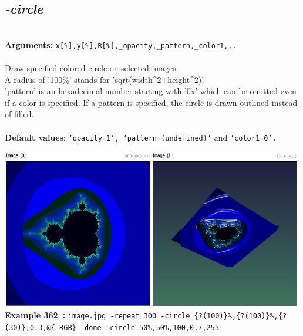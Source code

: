 \documentclass[a4paper,11pt,twoside]{book}
\begin{document}
\subsection{\emph{-circle} }\vspace*{-0.5em}
~\\\textbf{Arguments: } 
{\small \texttt{x[\%],y[\%],R[\%],\_opacity,\_pattern,\_color1,..}}\\~\\
Draw specified colored circle on selected images.
~\\A radius of '100\%' stands for 'sqrt(width\textasciicircum 2+height\textasciicircum 2)'.
~\\'pattern' is an hexadecimal number starting with '0x' which can be omitted
even if a color is specified. If a pattern is specified, the circle is
drawn outlined instead of filled.
~\\~\\\textbf{Default values}: {\small \texttt{'opacity=1', 'pattern=(undefined)'} and \texttt{'color1=0'.}}
\begin{center}\includegraphics[keepaspectratio=true,height=7cm,width=\textwidth]{img/gmic_def362.jpg}\\
{\footnotesize \textbf{Example 362~:} \texttt{image.jpg -repeat 300 -circle \{?(100)\}\%,\{?(100)\}\%,\{?(30)\},0.3,@\{-RGB\} -done -circle 50\%,50\%,100,0.7,255}}
\end{center}
\end{document}
